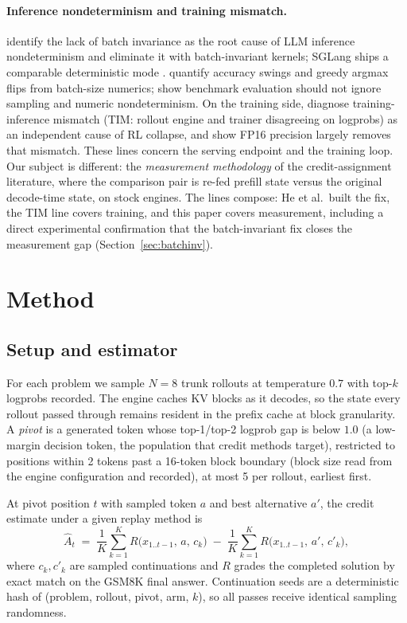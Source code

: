 \documentclass[11pt]{article}
\newcommand{\At}{\ensuremath{\hat{A}_t}\xspace}
\begin{document}
\paragraph{Inference nondeterminism and training mismatch.}
\citet{he2025nondeterminism} identify the lack of batch invariance as the
root cause of
LLM inference nondeterminism and eliminate it with batch-invariant kernels; SGLang
ships a comparable deterministic mode \citep{sglang2025deterministic}.
\citet{yuan2025numerical} quantify accuracy swings and greedy argmax flips
from batch-size numerics; \citet{song2024greedy} show benchmark evaluation
should not ignore sampling and numeric nondeterminism. On the training side,
\citet{zhong2026tim} diagnose training-inference mismatch (TIM: rollout engine
and trainer disagreeing on logprobs) as an independent cause of RL collapse,
and \citet{qi2025fp16} show FP16 precision largely removes that mismatch.
These lines concern the serving endpoint and the training loop. Our subject
is different: the \emph{measurement methodology} of the credit-assignment
literature, where the comparison pair is re-fed prefill state versus the
original decode-time state, on stock engines. The lines compose: He et
al.\ built the fix, the TIM line covers training, and this paper covers
measurement, including a direct experimental confirmation that the
batch-invariant fix closes the measurement gap (Section~\ref{sec:batchinv}).

\section{Method}

\subsection{Setup and estimator}

For each problem we sample $N = 8$ trunk rollouts at temperature $0.7$ with
top-$k$ logprobs recorded. The engine caches KV blocks as it decodes, so the
state every rollout passed through remains resident in the prefix cache at
block granularity. A \emph{pivot} is a generated token whose top-1/top-2
logprob gap is below $1.0$ (a low-margin decision token, the population
that credit methods target), restricted to positions within 2 tokens past a
16-token block boundary (block size read from the engine configuration and recorded), at
most 5 per rollout, earliest first.

At pivot position $t$ with sampled token $a$ and best alternative $a'$, the
credit estimate under a given replay method is
\[
\At \;=\; \frac{1}{K}\sum_{k=1}^{K} R\big(x_{1..t-1},\,a,\,c_k\big)
\;-\;
\frac{1}{K}\sum_{k=1}^{K} R\big(x_{1..t-1},\,a',\,c'_k\big),
\]
where $c_k, c'_k$ are sampled continuations and $R$ grades the completed
solution by exact match on the GSM8K \citep{cobbe2021gsm8k} final answer.
Continuation seeds are a deterministic hash of (problem, rollout, pivot,
arm, $k$), so all passes receive identical sampling randomness.
\end{document}
